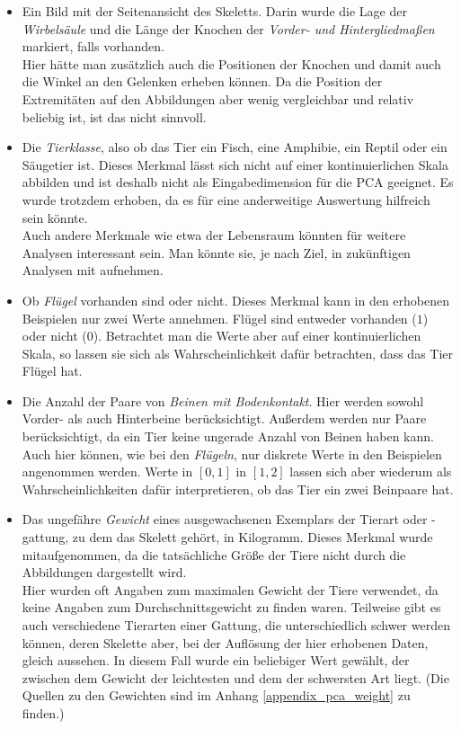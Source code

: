  \begin{itemize}
  \item Ein Bild mit der Seitenansicht des Skeletts.
  Darin wurde die Lage der \emph{Wirbelsäule} und die Länge der Knochen der \emph{Vorder- und Hintergliedmaßen} markiert, falls vorhanden.\\
  Hier hätte man zusätzlich auch die Positionen der Knochen und damit auch die Winkel an den Gelenken erheben können. Da die Position der Extremitäten auf den Abbildungen aber wenig vergleichbar und relativ beliebig ist, ist das nicht sinnvoll.
  
  \item Die \emph{Tierklasse}, also ob das Tier ein Fisch, eine Amphibie, ein Reptil oder ein Säugetier ist. Dieses Merkmal lässt sich nicht auf einer kontinuierlichen Skala abbilden und ist deshalb nicht als Eingabedimension für die PCA geeignet. Es wurde trotzdem erhoben, da es für eine anderweitige Auswertung hilfreich sein könnte.\\
  Auch andere Merkmale wie etwa der Lebensraum könnten für weitere Analysen interessant sein. Man könnte sie, je nach Ziel, in zukünftigen Analysen mit aufnehmen.
  
  \item Ob \emph{Flügel} vorhanden sind oder nicht. Dieses Merkmal kann in den erhobenen Beispielen nur zwei Werte annehmen. Flügel sind entweder vorhanden ($1$) oder nicht ($0$). Betrachtet man die Werte aber auf einer kontinuierlichen Skala, so lassen sie sich als Wahrscheinlichkeit dafür betrachten, dass das Tier Flügel hat.
  
  \item Die Anzahl der Paare von \emph{Beinen mit Bodenkontakt}. Hier werden sowohl Vorder- als auch Hinterbeine berücksichtigt. Außerdem werden nur Paare berücksichtigt, da ein Tier keine ungerade Anzahl von Beinen haben kann.\\
  Auch hier können, wie bei den \emph{Flügeln}, nur diskrete Werte in den Beispielen angenommen werden. Werte in $[0, 1]$ \bzw in $[1, 2]$ lassen sich aber wiederum als Wahrscheinlichkeiten dafür interpretieren, ob das Tier ein \bzw zwei Beinpaare hat.
  
  \item Das ungefähre \emph{Gewicht} eines ausgewachsenen Exemplars der Tierart oder -gattung, zu dem das Skelett gehört, in Kilogramm. Dieses Merkmal wurde mitaufgenommen, da die tatsächliche Größe der Tiere nicht durch die Abbildungen dargestellt wird.\\
  Hier wurden oft Angaben zum maximalen Gewicht der Tiere verwendet, da keine Angaben zum Durchschnittsgewicht zu finden waren. Teilweise gibt es auch verschiedene Tierarten einer Gattung, die unterschiedlich schwer werden können, deren Skelette aber, bei der Auflösung der hier erhobenen Daten, gleich aussehen. In diesem Fall wurde ein beliebiger Wert gewählt, der zwischen dem Gewicht der leichtesten und dem der schwersten Art liegt. (Die Quellen zu den Gewichten sind im Anhang \ref{appendix_pca_weight} zu finden.)
 \end{itemize}

